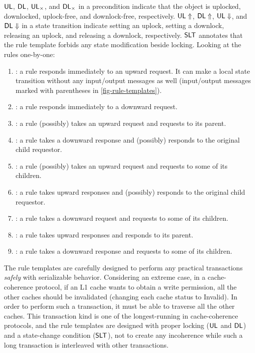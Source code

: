 \documentclass[sigplan,10pt,review,anonymous,screen]{acmart}\settopmatter{printfolios=true,printccs=false,printacmref=false}
\begin{document}
$\textsf{UL}$, $\textsf{DL}$, $\textsf{UL}_{\times}$, and $\textsf{DL}_{\times}$ in a precondition indicate that the object is uplocked, downlocked, uplock-free, and downlock-free, respectively.
$\textsf{UL}\Uparrow$, $\textsf{DL}\Uparrow$, $\textsf{UL}\Downarrow$, and $\textsf{DL}\Downarrow$ in a state transition indicate setting an uplock, setting a downlock, releasing an uplock, and releasing a downlock, respectively.
$\textsf{SLT}{}$ annotates that the rule template forbids any state modification beside locking.
Looking at the rules one-by-one:
\begin{enumerate}[label=(\alph*)]
\item {}: a rule responds immediately to an upward request. It can make a local state transition without any input/output messages as well (input/output messages marked with parentheses in \autoref{fig-rule-templates}).
\item {}: a rule responds immediately to a downward request.
\item {}: a rule (possibly) takes an upward request and requests to its parent.
\item {}: a rule takes a downward response and (possibly) responds to the original child requestor.
\item {}: a rule (possibly) takes an upward request and requests to some of its children.
\item {}: a rule takes upward responses and (possibly) responds to the original child requestor.
\item {}: a rule takes a downward request and requests to some of its children.
\item {}: a rule takes upward responses and responds to its parent.
\item {}: a rule takes a downward response and requests to some of its children.
\end{enumerate}

The rule templates are carefully designed to perform any practical transactions \emph{safely} with serializable behavior.
Considering an extreme case, in a cache-coherence protocol, if an L1 cache wants to obtain a write permission, all the other caches should be invalidated (changing each cache status to Invalid).
In order to perform such a transaction, it must be able to traverse all the other caches.
This transaction kind is one of the longest-running in cache-coherence protocols, and the rule templates are designed with proper locking ($\textsf{UL}$ and $\textsf{DL}$) and a state-change condition ($\textsf{SLT}$), not to create any incoherence while such a long transaction is interleaved with other transactions.
\end{document}
